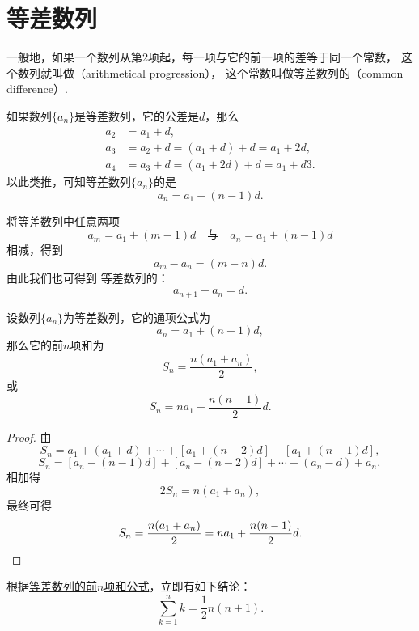 \section{等差数列}
一般地，如果一个数列从第2项起，每一项与它的前一项的差等于同一个常数，
这个数列就叫做（arithmetical progression），
这个常数叫做等差数列的（common difference）.

如果数列\(\{a_n\}\)是等差数列，它的公差是\(d\)，那么\begin{align*}
    a_2 &= a_1 + d, \\
    a_3 &= a_2 + d = (a_1 + d) + d = a_1 + 2d, \\
    a_4 &= a_3 + d = (a_1 + 2d) + d = a_1 + d3.
\end{align*}
以此类推，可知等差数列\(\{a_n\}\)的是\begin{equation}
    a_n = a_1 + (n-1) d.
\end{equation}

将等差数列中任意两项\[
    a_m = a_1 + (m-1) d
    \quad\text{与}\quad
    a_n = a_1 + (n-1) d
\]相减，得到\[
    a_m - a_n = (m-n) d.
\]
由此我们也可得到%
等差数列的：\begin{equation}
    a_{n+1} - a_n = d.
\end{equation}

\begin{property}[等差数列求和]
设数列\(\{a_n\}\)为等差数列，它的通项公式为\[
    a_n = a_1 + (n-1) d,
\]
那么它的前\(n\)项和为\begin{equation}\label{equation:数列.等差数列的前n项和1}
    S_n = \frac{n(a_1 + a_n)}{2},
\end{equation}
或\begin{equation}\label{equation:数列.等差数列的前n项和2}
    S_n = n a_1 + \frac{n(n-1)}{2} d.
\end{equation}
\begin{proof}
由\[
    S_n = a_1 + (a_1 + d) + \dotsb + [a_1 + (n-2)d] + [a_1 + (n-1)d],
\]\[
    S_n = [a_n - (n-1)d] + [a_n - (n-2)d] + \dotsb + (a_n - d) + a_n,
\]相加得\[
    2 S_n = n(a_1 + a_n),
\]最终可得\[
    S_n = \frac{n(a_1 + a_n)}{2} = n a_1 + \frac{n(n-1)}{2} d.
    \qedhere
\]
\end{proof}
\end{property}

根据\hyperref[equation:数列.等差数列的前n项和1]{等差数列的前\(n\)项和公式}，立即有如下结论：
\begin{equation}
    \sum\limits_{k=1}^n k = \frac{1}{2} n(n+1).
\end{equation}

